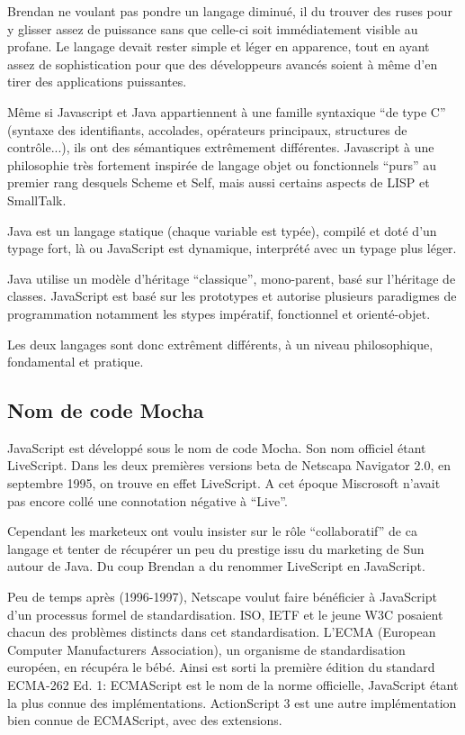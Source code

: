 Brendan ne voulant pas pondre un langage diminué, il du trouver des ruses pour y glisser assez de puissance sans que celle-ci soit immédiatement visible au profane. Le langage devait rester simple et léger en apparence, tout en ayant assez de sophistication pour que des développeurs avancés soient à même d’en tirer des applications puissantes.

Même si Javascript et Java appartiennent à une famille syntaxique “de type C” (syntaxe des identifiants, accolades, opérateurs principaux, structures de contrôle...), ils ont des sémantiques extrêmement différentes. Javascript à une philosophie très fortement inspirée de langage objet ou fonctionnels “purs” au premier rang desquels Scheme et Self, mais aussi certains aspects de LISP et SmallTalk.

Java est un langage statique (chaque variable est typée), compilé et doté d’un typage fort, là ou JavaScript est dynamique, interprété avec un typage plus léger.

Java utilise un modèle d’héritage “classique”, mono-parent, basé sur l’héritage de classes. JavaScript est basé sur les prototypes et autorise plusieurs paradigmes de programmation notamment les stypes impératif, fonctionnel et orienté-objet.

Les deux langages sont donc extrêment différents, à un niveau philosophique, fondamental et pratique.

\subsection{Nom de code Mocha}

JavaScript est développé sous le nom de code Mocha. Son nom officiel étant LiveScript. Dans les deux premières versions beta de Netscapa Navigator 2.0, en septembre 1995, on trouve en effet LiveScript. A cet époque Miscrosoft n’avait pas encore collé une connotation négative à “Live”.

Cependant les marketeux ont voulu insister sur le rôle “collaboratif” de ca langage et tenter de récupérer un peu du prestige issu du marketing de Sun autour de Java. Du coup Brendan a du renommer LiveScript en JavaScript.

Peu de temps après (1996-1997), Netscape voulut faire bénéficier à JavaScript d’un processus formel de standardisation. ISO, IETF et le jeune W3C posaient chacun des problèmes distincts dans cet standardisation. L’ECMA (European Computer Manufacturers Association), un organisme de standardisation européen, en récupéra le bébé. Ainsi est sorti la première édition du standard ECMA-262 Ed. 1: ECMAScript est le nom de la norme officielle, JavaScript étant la plus connue des implémentations. ActionScript 3 est une autre implémentation bien connue de ECMAScript, avec des extensions.

